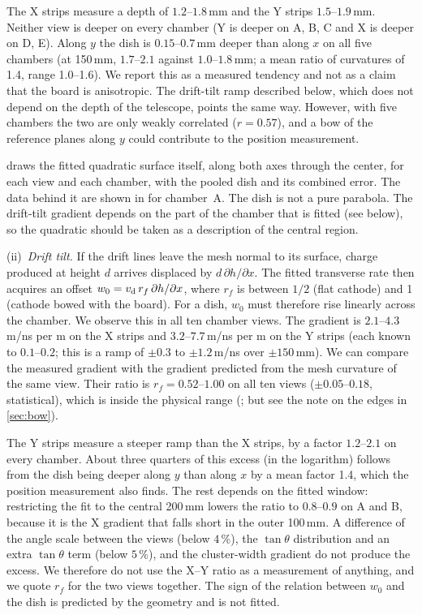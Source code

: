 The X strips measure a depth of $1.2$--$1.8$\,mm and the Y strips $1.5$--$1.9$\,mm. Neither view is deeper on every
chamber (Y is deeper on A, B, C and X is deeper on D, E). Along $y$ the dish is $0.15$--$0.7$\,mm deeper than along
$x$ on all five chambers (at 150\,mm, $1.7$--$2.1$ against $1.0$--$1.8$\,mm; a mean ratio of curvatures of 1.4, range
1.0--1.6). We report this as a measured tendency and not as a claim that the board is anisotropic. The drift-tilt ramp
described below, which does not depend on the depth of the telescope, points the same way. However, with five chambers
the two are only weakly correlated ($r=0.57$), and a bow of the reference planes along $y$ could contribute to the
position measurement.

 draws the fitted quadratic surface itself, along both axes through the center, for each view and
each chamber, with the pooled dish and its combined error. The data behind it are shown in  for
chamber~A. The dish is not a pure parabola. The drift-tilt gradient depends on the part of the chamber that is fitted
(see below), so the quadratic should be taken as a description of the central region.

(ii)~\emph{Drift tilt.} If the drift lines leave the mesh normal to its surface, charge produced at height $d$ arrives
displaced by $d\,\partial h/\partial x$. The fitted transverse rate then acquires an offset
$w_0 = v_\mathrm{d}\,r_f\,\partial h/\partial x$, where $r_f$ is between $1/2$ (flat cathode) and 1 (cathode bowed with the
board). For a dish, $w_0$ must therefore rise linearly across the chamber. We observe this in all ten chamber views.
The gradient is $2.1$--$4.3$\,\textmu m/ns per m on the X strips and $3.2$--$7.7$\,\textmu m/ns per m on the Y strips
(each known to $0.1$--$0.2$; this is a ramp of $\pm0.3$ to $\pm1.2$\,\textmu m/ns over $\pm150$\,mm). We can compare
the measured gradient with the gradient predicted from the mesh curvature of the same view. Their ratio is
$r_f = 0.52$--$1.00$ on all ten views ($\pm0.05$--$0.18$, statistical), which is inside the physical range
(; but see the note on the edges in \cref{sec:bow}).

The Y strips measure a steeper ramp than the X strips, by a factor $1.2$--$2.1$ on every chamber. About three quarters
of this excess (in the logarithm) follows from the dish being deeper along $y$ than along $x$ by a mean factor 1.4,
which the position measurement also finds. The rest depends on the fitted window: restricting the fit to the central
200\,mm lowers the ratio to $0.8$--$0.9$ on A and B, because it is the X gradient that falls short in the outer
100\,mm. A difference of the angle scale between the views (below $4\,\%$), the $\tan\theta$ distribution and an extra
$\tan\theta$ term (below $5\,\%$), and the cluster-width gradient do not produce the excess. We therefore do not use
the X--Y ratio as a measurement of anything, and we quote $r_f$ for the two views together. The sign of the relation
between $w_0$ and the dish is predicted by the geometry and is not fitted.

